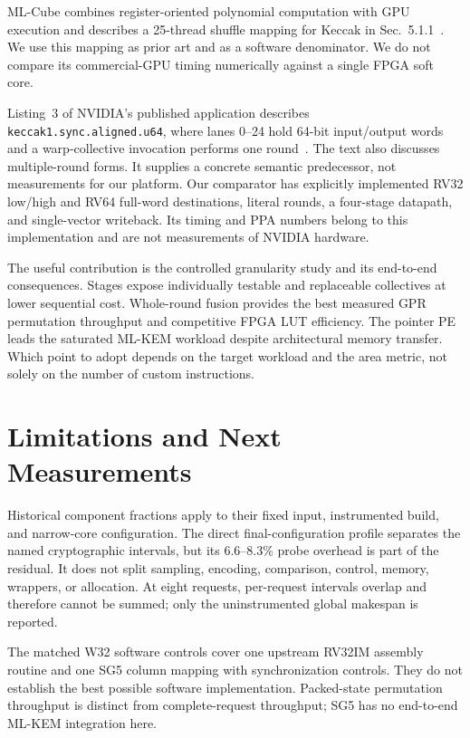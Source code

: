 \documentclass[conference,letterpaper]{IEEEtran}
\newcommand{\code}[1]{\texttt{#1}}
\begin{document}
ML-Cube combines register-oriented polynomial computation with GPU
execution and describes a 25-thread shuffle mapping for Keccak in
Sec.~5.1.1~\cite{mlcube}. We use this mapping as prior art and as a
software denominator. We do not compare its commercial-GPU timing
numerically against a single FPGA soft core.

Listing~3 of NVIDIA's published application describes
\code{keccak1.sync.aligned.u64}, where lanes 0--24 hold 64-bit
input/output words and a warp-collective invocation performs one
round~\cite{collectivepatent}. The text also discusses multiple-round
forms. It supplies a concrete semantic predecessor, not measurements
for our platform. Our comparator has explicitly implemented RV32 low/high
and RV64 full-word destinations, literal rounds, a four-stage datapath, and
single-vector writeback. Its timing and PPA numbers belong to this
implementation and are not measurements of NVIDIA hardware.

The useful contribution is the controlled granularity study and its
end-to-end consequences. Stages expose individually testable and replaceable
collectives at lower sequential cost. Whole-round fusion provides the best
measured GPR permutation throughput and competitive FPGA LUT efficiency.
The pointer PE leads the saturated ML-KEM workload despite architectural
memory transfer. Which point to adopt depends on the target workload and
the area metric, not solely on the number of custom instructions.

\section{Limitations and Next Measurements}
Historical component fractions apply to their fixed input, instrumented
build, and narrow-core configuration. The direct final-configuration profile
separates the named cryptographic intervals, but its 6.6--8.3\% probe overhead
is part of the residual. It does not split sampling, encoding, comparison,
control, memory, wrappers, or allocation. At eight requests, per-request
intervals overlap and therefore cannot be summed; only the uninstrumented
global makespan is reported.

The matched W32 software controls cover one upstream RV32IM assembly routine
and one SG5 column mapping with synchronization controls. They do not establish the best possible
software implementation. Packed-state permutation throughput is distinct from
complete-request throughput; SG5 has no end-to-end ML-KEM integration here.
\end{document}

